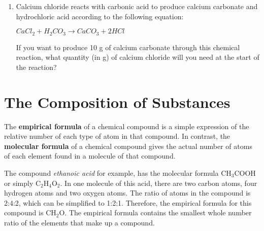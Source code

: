 {\begin{enumerate}
{	\begin{enumerate}
	\item{What mass of zinc will you need for the reaction, if all the sulfur is to be used up?}
	\item{What mass of zinc sulfide will this reaction produce?}
	\end{enumerate}
}

\item{Calcium chloride reacts with carbonic acid to produce calcium carbonate and hydrochloric acid according to the following equation:
\begin{center}
\rm${CaCl_{2} + H_{2}CO_{3} \rightarrow CaCO_{3} + 2HCl}$
\end{center}
If you want to produce 10 g of calcium carbonate through this chemical reaction, what quantity (in g) of calcium chloride will you need at the start of the reaction?}



\end{enumerate}
}







\section{The Composition of Substances}
\label{sec:quant:composition}

The \textbf{empirical formula} of a chemical compound is a simple expression of the relative number of each type of atom in that compound. In contrast, the \textbf{molecular formula} of a chemical compound gives the actual number of atoms of each element found in a molecule of that compound.



The compound \textit{ethanoic acid} for example, has the molecular formula CH$_{3}$COOH or simply C$_{2}$H$_{4}$O$_{2}$. In one molecule of this acid, there are two carbon atoms, four hydrogen atoms and two oxygen atoms. The ratio of atoms in the compound is 2:4:2, which can be simplified to 1:2:1. Therefore, the empirical formula for this compound is CH$_{2}$O. The empirical formula contains the smallest whole number ratio of the elements that make up a compound.\\

